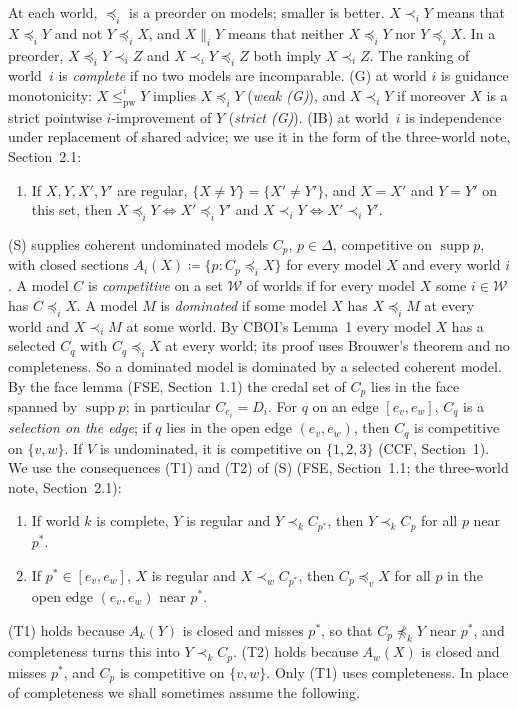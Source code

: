 \documentclass[11pt]{article}
\theoremstyle{definition}\newtheorem{definition}[theorem]{Definition}
\theoremstyle{remark}\newtheorem{remark}[theorem]{Remark}
\newcommand{\supp}{\operatorname{supp}}
\newcommand{\pw}{\mathrm{pw}}
\begin{document}
At each world, $\preceq_i$ is a preorder on models; smaller is better.
$X\prec_iY$ means that $X\preceq_iY$ and not $Y\preceq_iX$, and
$X\parallel_iY$ means that neither $X\preceq_iY$ nor $Y\preceq_iX$. In a
preorder, $X\preceq_iY\prec_iZ$ and $X\prec_iY\preceq_iZ$ both imply
$X\prec_iZ$. The ranking of world~$i$ is \emph{complete} if no two models
are incomparable. (G) at world $i$ is guidance monotonicity: $X\le^i_\pw Y$
implies $X\preceq_iY$ (\emph{weak (G)}), and $X\prec_iY$ if moreover $X$ is a
strict pointwise $i$-improvement of $Y$ (\emph{strict (G)}). (IB) at
world~$i$ is independence under replacement of shared advice; we use it in
the form of the three-world note, Section~2.1:
\begin{enumerate}[label=(IB$'$),leftmargin=*]
\item If $X,Y,X',Y'$ are regular, $\{X\ne Y\}=\{X'\ne Y'\}$, and $X=X'$ and
$Y=Y'$ on this set, then $X\preceq_iY\iff X'\preceq_iY'$ and
$X\prec_iY\iff X'\prec_iY'$.
\end{enumerate}

(S) supplies coherent undominated models $C_p$, $p\in\Delta$, competitive on
$\supp p$, with closed sections $A_i(X)\coloneqq\{p:C_p\preceq_iX\}$ for
every model $X$ and every world $i$. A model $C$ is \emph{competitive} on a
set $\mathcal W$ of worlds if for every model $X$ some $i\in\mathcal W$ has
$C\preceq_iX$. A model $M$ is \emph{dominated} if some model $X$ has
$X\preceq_iM$ at every world and $X\prec_iM$ at some world. By CBOI's
Lemma~1 every model $X$ has a selected $C_q$ with $C_q\preceq_iX$ at every
world; its proof uses Brouwer's theorem and no completeness. So a dominated
model is dominated by a selected coherent model. By the face lemma (FSE,
Section~1.1) the credal set of $C_p$ lies in the face spanned by $\supp p$;
in particular $C_{e_i}=D_i$. For $q$ on an edge $[e_v,e_w]$, $C_q$ is a
\emph{selection on the edge}; if $q$ lies in the open edge $(e_v,e_w)$, then
$C_q$ is competitive on $\{v,w\}$. If $V$ is undominated, it is competitive
on $\{1,2,3\}$ (CCF, Section~1). We use the consequences (T1) and (T2) of
(S) (FSE, Section~1.1; the three-world note, Section~2.1):
\begin{enumerate}[label=(T\arabic*),leftmargin=*,itemsep=2pt]
\item If world $k$ is complete, $Y$ is regular and $Y\prec_kC_{p^*}$, then
$Y\prec_kC_p$ for all $p$ near $p^*$.
\item If $p^*\in[e_v,e_w]$, $X$ is regular and $X\prec_wC_{p^*}$, then
$C_p\preceq_vX$ for all $p$ in the open edge $(e_v,e_w)$ near $p^*$.
\end{enumerate}
(T1) holds because $A_k(Y)$ is closed and misses $p^*$, so that
$C_p\not\preceq_kY$ near $p^*$, and completeness turns this into
$Y\prec_kC_p$. (T2) holds because $A_w(X)$ is closed and misses $p^*$, and
$C_p$ is competitive on $\{v,w\}$. Only (T1) uses completeness. In place of
completeness we shall sometimes assume the following.
\end{document}
